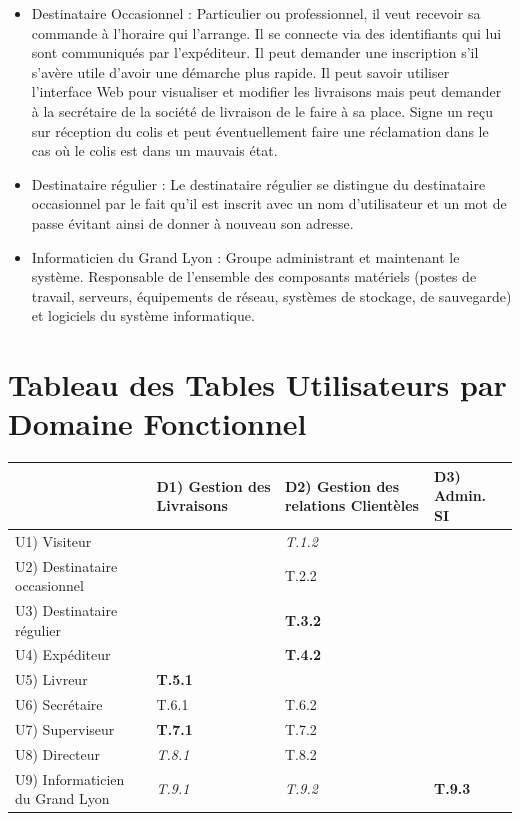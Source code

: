 \documentclass{report}
\begin{document}
\begin{itemize}
\item{Destinataire Occasionnel :} Particulier ou professionnel, il veut recevoir sa commande à l’horaire qui l’arrange. Il se connecte via des identifiants qui lui sont communiqués par l’expéditeur. Il peut demander une inscription s’il s’avère utile d’avoir une démarche plus rapide. Il peut savoir utiliser l’interface Web pour visualiser et modifier les livraisons mais peut demander à la secrétaire de la société de livraison de le faire à sa place. Signe un reçu sur réception du colis et peut éventuellement faire une réclamation dans le cas où le colis est dans un mauvais état.\\


\item{Destinataire régulier :} Le destinataire régulier se distingue du destinataire occasionnel par le fait qu’il est inscrit avec un nom d’utilisateur et un mot de passe évitant ainsi de donner à nouveau son adresse.\\

\item{Informaticien du Grand Lyon :} Groupe administrant et maintenant le système. Responsable de l’ensemble des composants matériels (postes de travail, serveurs, équipements de réseau, systèmes de stockage, de sauvegarde) et logiciels du système informatique.\\

\end{itemize}

\section{Tableau des Tables Utilisateurs par Domaine Fonctionnel}

\begin{tabular}{|p{5cm}|p{3cm}|p{3cm}|p{3cm}|}
\hline
&D1) Gestion des Livraisons & D2) Gestion des relations Clientèles & D3) Admin. SI\\
\hline
U1) Visiteur&&\cellcolor{green}\textit{T.1.2}&\\
\hline
U2) Destinataire occasionnel&&\cellcolor{green}T.2.2&\\
\hline
U3) Destinataire régulier &&\cellcolor{green}\textbf{T.3.2}&\\
\hline
U4) Expéditeur&&\cellcolor{green}\textbf{T.4.2}&\\
\hline
U5) Livreur&\cellcolor{violet}\textbf{T.5.1}&&\\
\hline
U6) Secrétaire&\cellcolor{blue}T.6.1&\cellcolor{blue}T.6.2&\\
\hline
U7) Superviseur&\cellcolor{violet}\textbf{T.7.1}&\cellcolor{blue}T.7.2&\\
\hline
U8) Directeur&\cellcolor{blue}\textit{T.8.1}&\cellcolor{blue}T.8.2&\\
\hline
U9) Informaticien du Grand Lyon& \cellcolor{red}\textit{T.9.1}&\cellcolor{red}\textit{T.9.2}&\cellcolor{red}\textbf{T.9.3}\\
\hline
\end{tabular}
\end{document}
